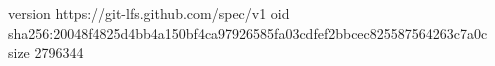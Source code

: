 version https://git-lfs.github.com/spec/v1
oid sha256:20048f4825d4bb4a150bf4ca97926585fa03cdfef2bbcec825587564263c7a0c
size 2796344
